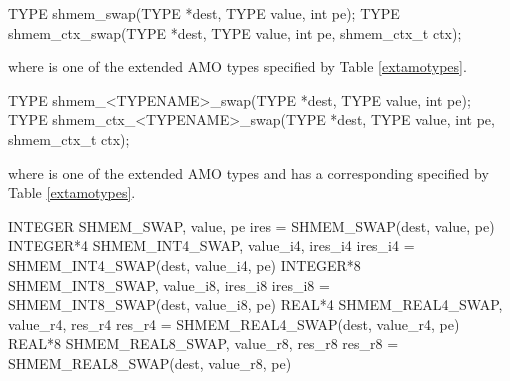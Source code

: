 
\begin{apidefinition}

\begin{C11synopsis}
TYPE shmem_swap(TYPE *dest, TYPE value, int pe);
TYPE shmem_ctx_swap(TYPE *dest, TYPE value, int pe, shmem_ctx_t ctx);
\end{C11synopsis}
where \TYPE{} is one of the extended \ac{AMO} types specified by Table \ref{extamotypes}.

\begin{Csynopsis}
TYPE shmem_<TYPENAME>_swap(TYPE *dest, TYPE value, int pe);
TYPE shmem_ctx_<TYPENAME>_swap(TYPE *dest, TYPE value, int pe, shmem_ctx_t ctx);
\end{Csynopsis}
where \TYPE{} is one of the extended \ac{AMO} types and has a corresponding \TYPENAME{} specified by Table \ref{extamotypes}.

\begin{Fsynopsis}
INTEGER SHMEM_SWAP, value, pe
ires = SHMEM_SWAP(dest, value, pe) 
INTEGER*4 SHMEM_INT4_SWAP, value_i4, ires_i4
ires_i4 = SHMEM_INT4_SWAP(dest, value_i4, pe) 
INTEGER*8 SHMEM_INT8_SWAP, value_i8, ires_i8
ires_i8 = SHMEM_INT8_SWAP(dest, value_i8, pe)
REAL*4 SHMEM_REAL4_SWAP, value_r4, res_r4
res_r4 = SHMEM_REAL4_SWAP(dest, value_r4, pe) 
REAL*8 SHMEM_REAL8_SWAP, value_r8, res_r8
res_r8 = SHMEM_REAL8_SWAP(dest, value_r8, pe)
\end{Fsynopsis}

\begin{apiarguments}
\end{apiarguments}



\end{apidefinition}
